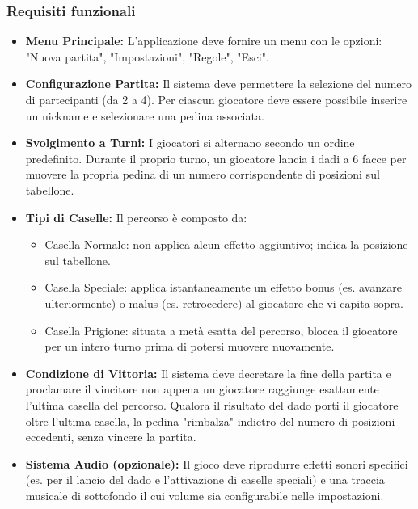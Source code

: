 \documentclass[a4paper,12pt]{report}
\begin{document}
\subsubsection{Requisiti funzionali}
\begin{itemize}
	\item \textbf{Menu Principale:} L'applicazione deve fornire un menu con le opzioni: "Nuova partita", "Impostazioni", "Regole", "Esci".
	\item \textbf{Configurazione Partita:} Il sistema deve permettere la selezione del numero di partecipanti (da 2 a 4). Per ciascun giocatore deve essere possibile inserire un nickname e selezionare una pedina associata.
	\item \textbf{Svolgimento a Turni:} I giocatori si alternano secondo un ordine predefinito. Durante il proprio turno, un giocatore lancia i dadi a 6 facce per muovere la propria pedina di un numero corrispondente di posizioni sul tabellone.
    \item \textbf{Tipi di Caselle:} Il percorso è composto da:
    \begin{itemize}
        \item Casella Normale: non applica alcun effetto aggiuntivo; indica la posizione sul tabellone.
        \item Casella Speciale: applica istantaneamente un effetto bonus (es. avanzare ulteriormente) o malus (es. retrocedere) al giocatore che vi capita sopra.
        \item Casella Prigione: situata a metà esatta del percorso, blocca il giocatore per un intero turno prima di potersi muovere nuovamente.
    \end{itemize}
    \item \textbf{Condizione di Vittoria:} Il sistema deve decretare la fine della partita e proclamare il vincitore non appena un giocatore raggiunge esattamente l'ultima casella del percorso. Qualora il risultato del dado porti il giocatore oltre l'ultima casella, la pedina "rimbalza" indietro del numero di posizioni eccedenti, senza vincere la partita.
    \item \textbf{Sistema Audio (opzionale):} Il gioco deve riprodurre effetti sonori specifici (es. per il lancio del dado e l'attivazione di caselle speciali) e una traccia musicale di sottofondo il cui volume sia configurabile nelle impostazioni.
\end{itemize}
\end{document}
